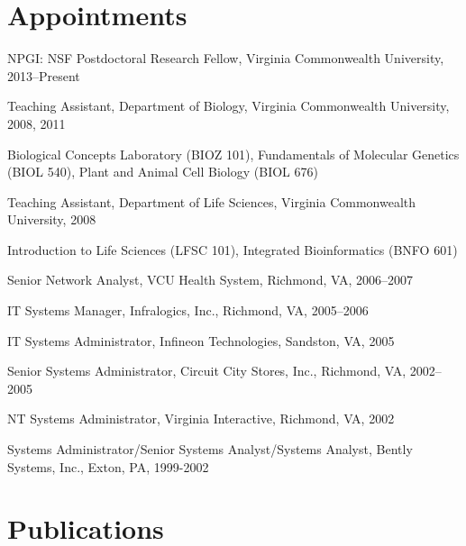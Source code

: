 \section{Appointments}

\begin{packed_item}
	\item{NPGI: NSF Postdoctoral Research Fellow, Virginia Commonwealth University, 2013--Present}
	\item{Teaching Assistant, Department of Biology, Virginia Commonwealth University, 2008, 2011}
	
	\begin{packed_item}
	\item{Biological Concepts Laboratory (BIOZ 101), 
	Fundamentals of Molecular Genetics (BIOL 540), 
	Plant and Animal Cell Biology (BIOL 676) }
	\end{packed_item}
	
	\item{Teaching Assistant, Department of Life Sciences, Virginia Commonwealth University, 2008}
	
	\begin{packed_item}
	\item{Introduction to Life Sciences (LFSC 101), Integrated Bioinformatics (BNFO 601)}
	\end{packed_item}
	
	\item{Senior Network Analyst, VCU Health System, Richmond, VA, 
	2006--2007}
	\item{IT Systems Manager, Infralogics, Inc., Richmond, VA, 2005--2006}
	\item{IT Systems Administrator, Infineon Technologies, Sandston, VA, 2005}
	\item{Senior Systems Administrator, Circuit City Stores, Inc., Richmond, VA, 2002--2005}
	\item{NT Systems Administrator, Virginia Interactive, Richmond, VA, 2002}
	\item{Systems Administrator/Senior Systems Analyst/Systems Analyst, Bently Systems, 
	Inc., Exton, PA, 1999-2002}
\end{packed_item}

\section{Publications}

